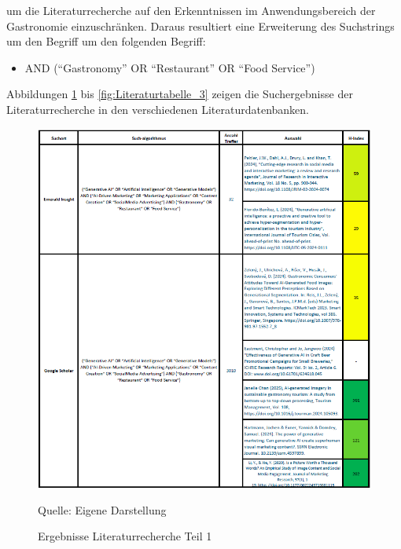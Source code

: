 um die Literaturrecherche auf den Erkenntnissen im Anwendungsbereich der Gastronomie einzuschränken.
Daraus resultiert eine Erweiterung des Suchstrings um den Begriff um den folgenden Begriff:

\begin{itemize}
    \item AND (``Gastronomy'' OR ``Restaurant'' OR ``Food Service'')
\end{itemize}

Abbildungen \ref{fig:Literaturtabelle_1} bis \ref{fig:Literaturtabelle_3} zeigen die Suchergebnisse der Literaturrecherche in den verschiedenen Literaturdatenbanken.

\begin{figure}[htbp]
    \centering
    \includegraphics[width=\textwidth]{abbildungen/Literaturtabelle_1}
    \caption{Ergebnisse Literaturrecherche Teil 1}
    \label{fig:Literaturtabelle_1}
    \vspace{0.5cm}
    \raggedright Quelle: Eigene Darstellung
\end{figure}

